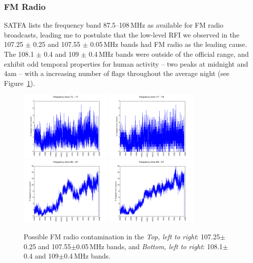 \subsubsection*{FM Radio}

SATFA lists the frequency band 87.5--108\,MHz as available for FM radio broadcasts, leading me to postulate that the low-level RFI we observed in the 107.25	$\pm$	0.25 and 107.55	$\pm$	0.05\,MHz bands had FM radio as the leading cause. The 108.1	$\pm$	0.4 and 109	$\pm$	0.4\,MHz bands were outside of the official range, and exhibit odd temporal properties for human activity -- two peaks at midnight and 4am -- with a increasing number of flags throughout the average night (see Figure~\ref{fig:rfi_psa128_FMradio}).

\begin{figure}[h!]
\centering
\includegraphics[width=0.4\textwidth]{chapters/data_processing/figures/FB_71_77.png}
\includegraphics[width=0.4\textwidth]{chapters/data_processing/figures/FB_77_79.png}
\includegraphics[width=0.4\textwidth]{chapters/data_processing/figures/FB_80_87.png}
\includegraphics[width=0.4\textwidth]{chapters/data_processing/figures/FB_89_97.png}
\caption[Possible FM radio contamination.]{Possible FM radio contamination in the \textit{Top, left to right}: 107.25$\pm$0.25 and 107.55$\pm$0.05\,MHz bands, and \textit{Bottom, left to right}: 108.1$\pm$0.4 and 109$\pm$0.4\,MHz bands.}
\label{fig:rfi_psa128_FMradio}
\end{figure}

